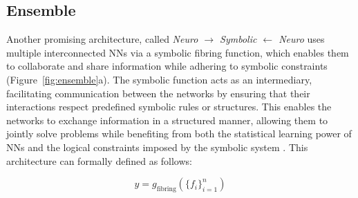 \documentclass[12pt]{article}
\begin{document}


\subsection{Ensemble}
Another promising architecture, called \textit{Neuro $\to$ Symbolic $\leftarrow$ Neuro} uses multiple interconnected NNs  via a symbolic fibring function, which enables them to collaborate and share information while adhering to symbolic constraints (Figure~\ref{fig:ensemble}a). The symbolic function acts as an intermediary, facilitating communication between the networks by ensuring that their interactions respect predefined symbolic rules or structures. This enables the networks to exchange information in a structured manner, allowing them to jointly solve problems while benefiting from both the statistical learning power of NNs and the logical constraints imposed by the symbolic system \cite{garcez2004fibring}. This architecture can formally defined as follows:

\begin{equation}
 y = g_\text{fibring}(\{f_i\}_{i=1}^n)   
\end{equation}
\end{document}
